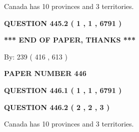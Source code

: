 \documentclass[12pt]{article}
\begin{document}
 
\noindent{}
 
 
Canada has 10  provinces and 3 territories.
 
 
 
 
  
\vspace{0.2in}
  
{\textbf{\Large{QUESTION
445.2 
 ( 1 , 1 , 6791 )
}}}
  
  
   
   
 \vspace{0.2in}
 
   
   
   
   
\vspace{1.0in} 
{\textbf{\large{ *** END OF PAPER, THANKS *** }}} 
   
   
\hspace{1.0in} By: 
 239 ( 416 ,  613 )
   
   
   
   
\newpage 
\setcounter{page}{ 
   446001 } 
   
   
   
   
 {\textbf{ \Large{ PAPER NUMBER  446  }}}
   
   
\vspace{0.2in}
   
   
   
   
   
   
 \vspace{0.2in}
 
 
 
 
   
   
  
\vspace{0.2in}
  
{\textbf{\Large{QUESTION
446.1 
 ( 1 , 1 , 6791 )
}}}
  
  
  
\vspace{0.2in}
  
{\textbf{\Large{QUESTION
446.2 
 ( 2 , 2 , 3 )
}}}
  
  
 
 
\noindent{}
 
 
Canada has 10  provinces and 3 territories.
 
\end{document}
